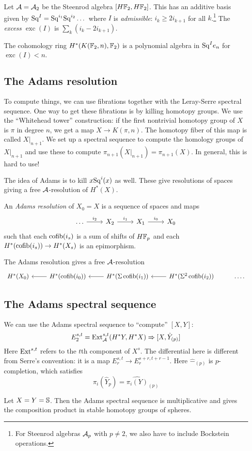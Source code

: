 \documentclass{article}
\begin{document}
Let $\mathcal{A} = \mathcal{A}_2$ be the Steenrod algebra $[H\mathbb{F}_2, H\mathbb{F}_2]$.
This has an additive basis given by $\mathrm{Sq}^I = \mathrm{Sq}^{i_1} \mathrm{Sq}^{i_2} \dots$ where $I$ is \emph{admissible}: $i_k \geq 2 i_{k+1}$ for all $k$.\footnote{For Steenrod algebras $\mathcal{A}_p$ with $p \neq 2$, we also have to include Bockstein operations.}
The \emph{excess} $\operatorname{exc}(I)$ is $\sum_k (i_k - 2 i_{k+1})$.

\begin{thm}[Serre]
	The cohomology ring $H^*(K(\mathbb{F}_2, n), \mathbb{F}_2)$ is a polynomial algebra in $\mathrm{Sq}^I e_n$ for $\operatorname{exc}(I) < n$.
\end{thm}

\subsection{The Adams resolution}

To compute things, we can use fibrations together with the Leray-Serre spectral sequence.
One way to get these fibrations is by killing homotopy groups.
We use the ``Whitehead tower'' construction: if the first nontrivial homotopy group of $X$ is $\pi$ in degree $n$, we get a map $X \to K(\pi, n)$.
The homotopy fiber of this map is called $X|_{n+1}$.
We set up a spectral sequence to compute the homology groups of $X|_{n+1}$ and use these to compute $\pi_{n+1}(X|_{n+1}) = \pi_{n+1}(X)$.
In general, this is hard to use!

The idea of Adams is to kill $x \mathrm{Sq}^i(x)$ as well.
These give resolutions of spaces giving a free $\mathcal{A}$-resolution of $H^*(X)$.

\begin{dfn}
	An \emph{Adams resolution} of $X_0 = X$ is a sequence of spaces and maps
	\[
		\begin{tikzcd}
			\dots \rar["i_2"] & X_2 \rar["i_1"] & X_1 \rar["i_0"] & X_0
		\end{tikzcd}
	\]
	such that each $\operatorname{cofib}(i_s)$ is a sum of shifts of $H\mathbb{F}_p$ and each $H^*(\operatorname{cofib}(i_s)) \to H^*(X_s)$ is an epimorphism.
\end{dfn}

The Adams resolution gives a free $\mathcal{A}$-resolution
\[
	\begin{tikzcd}
		H^*(X_0) & H^*(\cofib(i_0)) \lar & H^*(\Sigma \cofib(i_1)) \lar & H^*(\Sigma^2 \cofib(i_2)) \lar & \dots.
	\end{tikzcd}
\]

\subsection{The Adams spectral sequence}

We can use the Adams spectral sequence to ``compute'' $[X, Y]$:
\[
	E_2^{s,t} = \operatorname{Ext}_{\mathcal{A}}^{s,t}(H^* Y, H^* X) \Rightarrow [X, \hat{Y}_{(p)}]
\]
Here $\operatorname{Ext}^{s,t}$ refers to the $t$th component of $X^s$.
The differential here is different from Serre's convention: it is a map $E_r^{s,t} \to E_r^{s+r,t+r-1}$.
Here $\hat{-}_{(p)}$ is $p$-completion, which satisfies
\[
	\pi_i(\hat{Y}_p) = \widehat{\pi_i(Y)}_{(p)}
\]

Let $X = Y = \mathbb{S}$.
Then the Adams spectral sequence is multiplicative and gives the composition product in stable homotopy groups of spheres.
\end{document}
